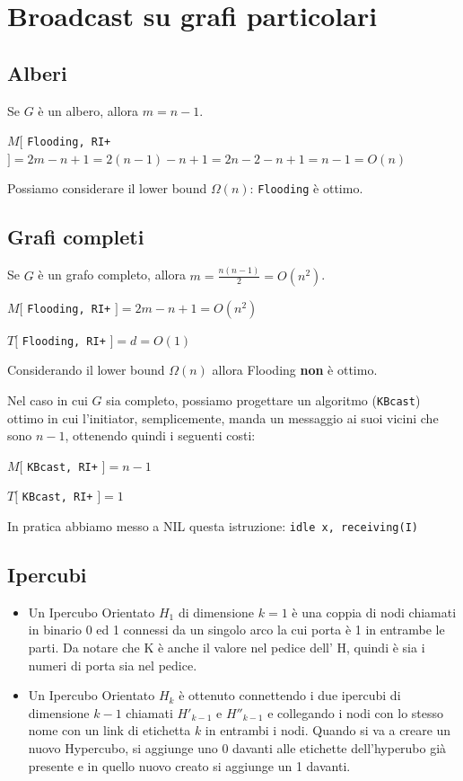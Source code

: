 \section{Broadcast su grafi particolari}
\subsection{Alberi}
Se $G$ è un albero, allora $m=n-1$.

\begin{center}
  $M[$ \texttt{Flooding, RI+} $] = 2m -n+1 = 2(n-1) -n+1 =  2n-2-n+1 = n-1 = O(n)$
\end{center}

Possiamo considerare il lower bound $\Omega(n)$: \texttt{Flooding} è ottimo.

\subsection{Grafi completi}
Se $G$ è un grafo completo, allora $m = \frac{n(n-1)}{2} = O(n^2)$.

\begin{center}
  $M[$ \texttt{Flooding, RI+} $] = 2m-n+1 = O(n^2)$

  $T[$ \texttt{Flooding, RI+} $] = d = O(1)$
\end{center}

Considerando il lower bound $\Omega(n)$ allora Flooding \textbf{non} è ottimo.

Nel caso in cui $G$ sia completo, possiamo progettare un algoritmo (\texttt{KBcast}) ottimo in cui l'initiator, semplicemente, manda un messaggio ai suoi vicini che sono $n-1$, ottenendo quindi i seguenti costi:
\begin{center}
  $M[$ \texttt{KBcast, RI+} $] = n-1$

  $T[$ \texttt{KBcast, RI+} $] = 1$
\end{center}

In pratica abbiamo messo a NIL questa istruzione: \texttt{idle x, receiving(I)}

\subsection{Ipercubi}
\begin{itemize}
    \item Un Ipercubo Orientato $H_1$ di dimensione $k=1$ è una coppia di nodi chiamati in binario 0 ed 1 connessi da un singolo arco la cui porta è 1 in entrambe le parti. Da notare che K è anche il valore nel pedice dell' H, quindi è sia i numeri di porta sia nel pedice.
    \item Un Ipercubo Orientato $H_k$ è ottenuto connettendo i due ipercubi di dimensione $k-1$ chiamati $H'_{k-1}$ e $H''_{k-1}$ e collegando i nodi con lo stesso nome con un link di etichetta $k$ in entrambi i nodi. Quando si va a creare un nuovo Hypercubo, si aggiunge uno 0 davanti alle etichette dell'hyperubo già presente e in quello nuovo creato si aggiunge un 1 davanti. 
\end{itemize}


